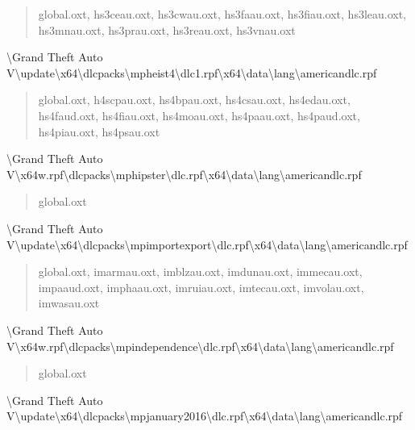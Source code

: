 \documentclass[]{scrartcl}
\begin{document}
\begin{quote}
   \ttfamily
   global.oxt, hs3ceau.oxt, hs3cwau.oxt, hs3faau.oxt, hs3fiau.oxt, hs3leau.oxt, hs3mnau.oxt, hs3prau.oxt, hs3reau.oxt, hs3vnau.oxt
\end{quote}

\textbackslash{}Grand Theft Auto V\textbackslash{}update\textbackslash{}x64\textbackslash{}dlcpacks\textbackslash{}mpheist4\textbackslash{}dlc1.rpf\textbackslash{}x64\textbackslash{}data\textbackslash{}lang\textbackslash{}americandlc.rpf

\begin{quote}
   \ttfamily
   global.oxt, h4scpau.oxt, hs4bpau.oxt, hs4csau.oxt, hs4edau.oxt, hs4faud.oxt, hs4fiau.oxt, hs4moau.oxt, hs4paau.oxt, hs4paud.oxt, hs4piau.oxt, hs4psau.oxt
\end{quote}

\textbackslash{}Grand Theft Auto V\textbackslash{}x64w.rpf\textbackslash{}dlcpacks\textbackslash{}mphipster\textbackslash{}dlc.rpf\textbackslash{}x64\textbackslash{}data\textbackslash{}lang\textbackslash{}americandlc.rpf

\begin{quote}
   \ttfamily
   global.oxt
\end{quote}

\textbackslash{}Grand Theft Auto V\textbackslash{}update\textbackslash{}x64\textbackslash{}dlcpacks\textbackslash{}mpimportexport\textbackslash{}dlc.rpf\textbackslash{}x64\textbackslash{}data\textbackslash{}lang\textbackslash{}americandlc.rpf

\begin{quote}
   \ttfamily
   global.oxt, imarmau.oxt, imblzau.oxt, imdunau.oxt, immecau.oxt, impaaud.oxt, imphaau.oxt, imruiau.oxt, imtecau.oxt, imvolau.oxt, imwasau.oxt
\end{quote}

\textbackslash{}Grand Theft Auto V\textbackslash{}x64w.rpf\textbackslash{}dlcpacks\textbackslash{}mpindependence\textbackslash{}dlc.rpf\textbackslash{}x64\textbackslash{}data\textbackslash{}lang\textbackslash{}americandlc.rpf

\begin{quote}
   \ttfamily
   global.oxt
\end{quote}

\textbackslash{}Grand Theft Auto V\textbackslash{}update\textbackslash{}x64\textbackslash{}dlcpacks\textbackslash{}mpjanuary2016\textbackslash{}dlc.rpf\textbackslash{}x64\textbackslash{}data\textbackslash{}lang\textbackslash{}americandlc.rpf
\end{document}
